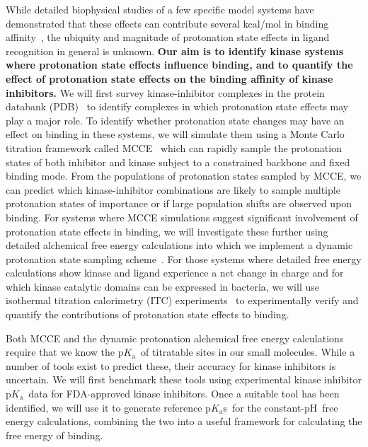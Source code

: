 \documentclass[10pt,final]{article}
\newcommand{\pKa}{p$K_\mathrm{a}$\ }
\newcommand{\pH}{p$\mathrm{H}$\ }
\newcommand{\pKas}{p$K_\mathrm{a}$s\ }
\begin{document}
While detailed biophysical studies of a few specific model systems have demonstrated that these effects can contribute several kcal/mol in binding affinity~\autocite{Dullweber2001a,Aleksandrov2007a,Czodrowski2007a,Steuber2007a,Czodrowski2007b},
the ubiquity and magnitude of protonation state effects in ligand recognition in general is unknown.
%
\textbf{Our aim is to identify kinase systems where protonation state effects influence binding, and to quantify the effect of protonation state effects on the binding affinity of kinase inhibitors.}
%
We will first survey kinase-inhibitor complexes in the protein databank (PDB)~\autocite{Berman2000a} to identify complexes in which protonation state effects may play a major role.
%
To identify whether protonation state changes may have an effect on binding in these systems, we will simulate them using a Monte Carlo titration framework called MCCE~\autocite{Song2009a} which can rapidly sample the protonation states of both inhibitor and kinase subject to a constrained backbone and fixed binding mode.
%
From the populations of protonation states sampled by MCCE, we can predict which kinase-inhibitor combinations are likely to sample multiple protonation states of importance or if large population shifts are observed upon binding.
%
For systems where MCCE simulations suggest significant involvement of protonation state effects in binding, we will investigate these further using detailed alchemical free energy calculations into which we implement a dynamic protonation state sampling scheme~\autocite{Mongan2004a,Stern2007a,Nilmeier2011a}.
%
For those systems where detailed free energy calculations show kinase and ligand experience a net change in charge and for which kinase catalytic domains can be expressed in bacteria, we will use isothermal titration calorimetry (ITC) experiments~\autocite{Baker1996a,Neeb2014a} to experimentally verify and quantify the contributions of protonation state effects to binding.
%

Both MCCE and the dynamic protonation alchemical free energy calculations require that we know the \pKa of titratable sites in our small molecules. 
%
While a number of tools exist to predict these, their accuracy for kinase inhibitors is uncertain.
%
We will first benchmark these tools using experimental kinase inhibitor \pKa data for FDA-approved kinase inhibitors.
%
Once a suitable tool has been identified, we will use it to generate reference \pKas for the constant-\pH free energy calculations, combining the two into a useful framework for calculating the free energy of binding.
\end{document}
